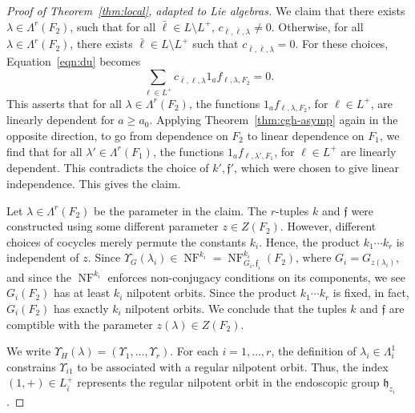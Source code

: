 \documentclass[12pt]{amsart}
\newcommand{\op}[1]{\operatorname{#1}}
\def\NF{\op{NF}}
\def\Y{\Upsilon}
\def\s{{\mathfrak{f}}}
\newcommand{\fh}{\mathfrak{h}}
\theoremstyle{plain}
\theoremstyle{definition}
\begin{document}
\begin{proof}[Proof of Theorem~\ref{thm:local}, adapted to Lie algebras]
We claim that there exists $\lambda\in \Lambda^r({F_2})$, such that
for all ${\bar\ell}\in L\setminus L^+$,
$c_{{\bar\ell},{\bar\ell},\lambda}\ne 0$.  Otherwise, for all
$\lambda\in \Lambda^r(F_2)$, there exists ${\bar\ell}\in L\setminus
L^+$ such that $c_{{\bar\ell},{\bar\ell},\lambda}=0$.  For these
choices, Equation~\ref{eqn:du} becomes
\begin{equation}\label{eqn:du2}
\sum_{\ell\in L^+} c_{{\bar\ell},\ell,\lambda}1_af_{\ell,\lambda,F_2}  = 0.
\end{equation}
This asserts that for all $\lambda\in \Lambda^r(F_2)$, the functions
$1_af_{\ell,\lambda,F_2}$, for $\ell\in L^+$, are linearly dependent
for $a\ge a_0$.  Applying Theorem~\ref{thm:cgh-asymp} again in the
opposite direction, to go from dependence on $F_2$ to linear
dependence on $F_1$, we find that for all $\lambda'\in
\Lambda^r(F_1)$, the functions $1_af_{\ell,\lambda',F_1}$, for
$\ell\in L^+$ are linearly dependent.  This contradicts the choice of
$k',\s'$, which were chosen to give linear independence.  This gives
the claim.


Let $\lambda\in \Lambda^r(F_2)$ be the parameter in the claim.  The
$r$-tuples $k$ and $\s$ were constructed using some different
parameter $z\in Z(F_2)$.  However, different choices of cocycles
merely permute the constants $k_i$.  Hence, the product $k_1\cdots
k_r$ is independent of $z$.  Since $\Y_G(\lambda_i)\in
\NF^{k_i}=\NF^{k_i}_{G_i,\s_i}(F_2)$, where $G_i = G_{z(\lambda_i)}$,
and since the $\NF^{k_i}$ enforces non-conjugacy conditions on its
components, we see $G_i(F_2)$ has at least $k_i$ nilpotent orbits.
Since the product $k_1\cdots k_r$ is fixed, in fact, $G_i(F_2)$ has
exactly $k_i$ nilpotent orbits.  We conclude that the tuples $k$ and
$\s$ are comptible with the parameter $z(\lambda)\in Z(F_2)$.

We write $\Y_H(\lambda)=(\Y_1,\ldots,\Y_r)$.  For each $i=1,\ldots,r$,
the definition of $\lambda_i\in\Lambda^1_i$ constrains $\Y_{i1}$ to be
associated with a regular nilpotent orbit.  Thus, the index $(1,+)\in
L^+_i$ represents the regular nilpotent orbit in the endoscopic group
$\fh_{z_i}$.


\end{proof}
\end{document}
